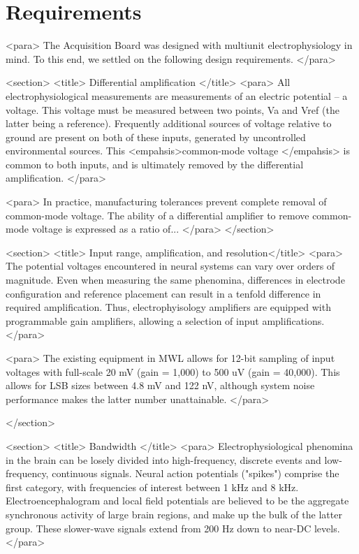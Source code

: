 
\section{Requirements}

    <para> The Acquisition Board was designed with multiunit
    electrophysiology in mind. To this end, we settled on the
    following design requirements. </para>
    
    
    <section>
      <title> Differential amplification </title>
      <para> All electrophysiological measurements are measurements of
      an electric potential -- a voltage. This voltage must be
      measured between two points, Va and Vref (the latter being a
      reference). Frequently additional sources of voltage relative to
      ground are present on both of these inputs, generated by
      uncontrolled environmental sources. This <empahsis>common-mode
      voltage </empahsis> is common to both inputs, and is ultimately
      removed by the differential amplification. </para>
      
      <para> In practice, manufacturing tolerances prevent complete
      removal of common-mode voltage. The ability of a differential
      amplifier to remove common-mode voltage is expressed as a ratio
      of... </para>
    </section>
    
    <section>
      <title> Input range, amplification, and resolution</title>
      <para> The potential voltages encountered in neural systems can
      vary over orders of magnitude. Even when measuring the same
      phenomina, differences in electrode configuration and reference
      placement can result in a tenfold difference in required
      amplification. Thus, electrophyisology amplifiers are equipped
      with programmable gain amplifiers, allowing a selection of input
      amplifications.  </para>
      
      <para> The existing equipment in MWL allows for 12-bit sampling
      of input voltages with full-scale 20 mV (gain = 1,000) to 500 uV
      (gain = 40,000). This allows for LSB sizes between 4.8 mV and
      122 nV, although system noise performance makes the latter
      number unattainable.  </para>
      
    </section>
    
    <section>
      <title> Bandwidth </title>
      <para> Electrophysiological phenomina in the brain can be losely
      divided into high-frequency, discrete events and low-frequency,
      continuous signals. Neural action potentials ("spikes") comprise
      the first category, with frequencies of interest between 1 kHz
      and 8 kHz. Electroencephalogram and local field potentials are
      believed to be the aggregate synchronous activity of large brain
      regions, and make up the bulk of the latter group. These
      slower-wave signals extend from 200 Hz down to near-DC levels. </para>

